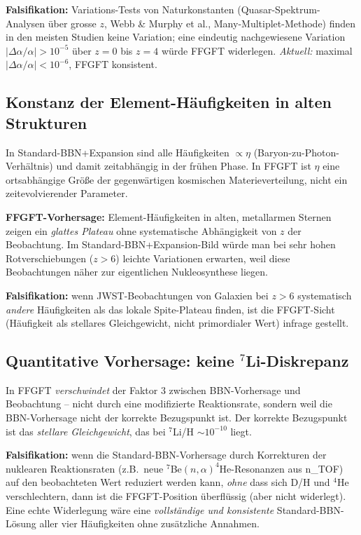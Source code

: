\textbf{Falsifikation:} Variations-Tests von Naturkonstanten
(Quasar-Spektrum-Analysen über grosse $z$, Webb \& Murphy et al.,
Many-Multiplet-Methode) finden in den meisten Studien keine
Variation; eine eindeutig nachgewiesene Variation
$|\Delta\alpha/\alpha| > 10^{-5}$ über $z = 0$ bis $z = 4$ würde
FFGFT widerlegen. \emph{Aktuell:} maximal $|\Delta\alpha/\alpha|
< 10^{-6}$, FFGFT konsistent.

\subsection{Konstanz der Element-Häufigkeiten in alten Strukturen}

In Standard-BBN+Expansion sind alle Häufigkeiten $\propto \eta$
(Baryon-zu-Photon-Verhältnis) und damit zeitabhängig in der
frühen Phase. In FFGFT ist $\eta$ eine ortsabhängige Größe der
gegenwärtigen kosmischen Materieverteilung, nicht ein
zeitevolvierender Parameter.

\textbf{FFGFT-Vorhersage:} Element-Häufigkeiten in alten,
metallarmen Sternen zeigen ein \emph{glattes Plateau} ohne
systematische Abhängigkeit von $z$ der Beobachtung. Im
Standard-BBN+Expansion-Bild würde man bei sehr hohen
Rotverschiebungen ($z > 6$) leichte Variationen erwarten, weil
diese Beobachtungen näher zur eigentlichen Nukleosynthese liegen.

\textbf{Falsifikation:} wenn JWST-Beobachtungen von Galaxien bei
$z > 6$ systematisch \emph{andere} Häufigkeiten als das lokale
Spite-Plateau finden, ist die FFGFT-Sicht (Häufigkeit als
stellares Gleichgewicht, nicht primordialer Wert) infrage gestellt.

\subsection{\texorpdfstring{Quantitative Vorhersage: keine $^7$Li-Diskrepanz}{Quantitative Vorhersage: keine 7Li-Diskrepanz}}

In FFGFT \emph{verschwindet} der Faktor $3$ zwischen BBN-Vorhersage
und Beobachtung -- nicht durch eine modifizierte Reaktionsrate,
sondern weil die BBN-Vorhersage nicht der korrekte Bezugspunkt ist.
Der korrekte Bezugspunkt ist das \emph{stellare Gleichgewicht}, das
bei $^7$Li/H $\sim 10^{-10}$ liegt.

\textbf{Falsifikation:} wenn die Standard-BBN-Vorhersage durch
Korrekturen der nuklearen Reaktionsraten (z.B.\ neue
$^7$Be$(n,\alpha)^4$He-Resonanzen aus n\_TOF) auf den beobachteten
Wert reduziert werden kann, \emph{ohne} dass sich D/H und $^4$He
verschlechtern, dann ist die FFGFT-Position überflüssig (aber
nicht widerlegt). Eine echte Widerlegung wäre eine \emph{vollständige
und konsistente} Standard-BBN-Lösung aller vier Häufigkeiten ohne
zusätzliche Annahmen.

